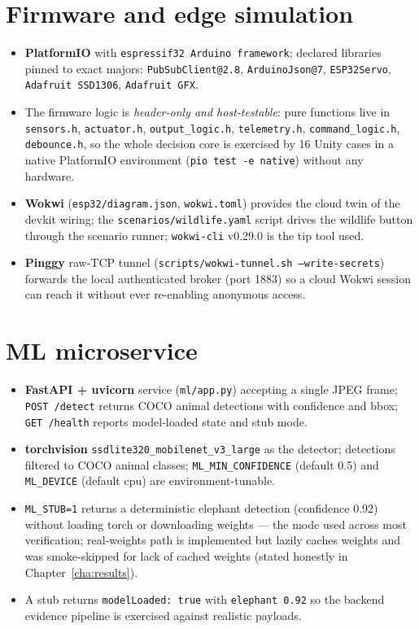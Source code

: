 \section{Firmware and edge simulation}

\begin{itemize}
  \item \textbf{PlatformIO} with \texttt{espressif32 Arduino framework};
        declared libraries pinned to exact majors: \texttt{PubSubClient@2.8},
        \texttt{ArduinoJson@7}, \texttt{ESP32Servo}, \texttt{Adafruit
        SSD1306}, \texttt{Adafruit GFX}.
  \item The firmware logic is \emph{header-only and host-testable}: pure
        functions live in \texttt{sensors.h}, \texttt{actuator.h},
        \texttt{output\_logic.h}, \texttt{telemetry.h},
        \texttt{command\_logic.h}, \texttt{debounce.h}, so the whole
        decision core is exercised by 16 Unity cases in a native PlatformIO
        environment (\texttt{pio test -e native}) without any hardware.
  \item \textbf{Wokwi} (\texttt{esp32/diagram.json}, \texttt{wokwi.toml})
        provides the cloud twin of the devkit wiring; the
        \texttt{scenarios/wildlife.yaml} script drives the wildlife button
        through the scenario runner; \texttt{wokwi-cli} v0.29.0 is the tip
        tool used.
  \item \textbf{Pinggy} raw-TCP tunnel
        (\texttt{scripts/wokwi-tunnel.sh --write-secrets}) forwards the
        local authenticated broker (port 1883) so a cloud Wokwi session
        can reach it without ever re-enabling anonymous access.
\end{itemize}

\section{ML microservice}

\begin{itemize}
  \item \textbf{FastAPI + uvicorn} service (\texttt{ml/app.py}) accepting
        a single JPEG frame; \texttt{POST /detect} returns COCO animal
        detections with confidence and bbox; \texttt{GET /health} reports
        model-loaded state and stub mode.
  \item \textbf{torchvision} \texttt{ssdlite320\_mobilenet\_v3\_large} as
        the detector; detections filtered to COCO animal classes;
        \texttt{ML\_MIN\_CONFIDENCE} (default 0.5) and \texttt{ML\_DEVICE}
        (default cpu) are environment-tunable.
  \item \texttt{ML\_STUB=1} returns a deterministic elephant detection
        (confidence 0.92) without loading torch or downloading weights ---
        the mode used across most verification; real-weights path is
        implemented but lazily caches weights and was smoke-skipped for
        lack of cached weights (stated honestly in Chapter~\ref{cha:results}).
  \item A stub returns \texttt{modelLoaded: true} with
        \texttt{elephant 0.92} so the backend evidence pipeline is
        exercised against realistic payloads.
\end{itemize}

